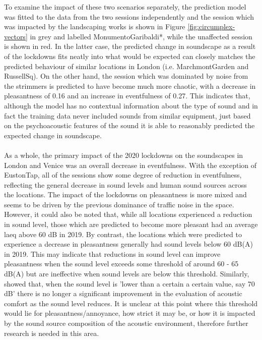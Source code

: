    To examine the impact of these two scenarios separately, the prediction model was fitted to the data from the two sessions independently and the session which was impacted by the landscaping works is shown in Figure \ref{fig:circumplex-vectors} in grey and labelled MonumentoGaribaldi*, while the unaffected session is shown in red. In the latter case, the predicted change in soundscape as a result of the lockdowns fits neatly into what would be expected can closely matches the predicted behaviour of similar locations in London (i.e. MarchmontGarden and RussellSq). On the other hand, the session which was dominated by noise from the strimmers is predicted to have become much more chaotic, with a decrease in pleasantness of 0.16 and an increase in eventfulness of 0.27. This indicates that, although the model has no contextual information about the type of sound and in fact the training data never included sounds from similar equipment, just based on the psychoacoustic features of the sound it is able to reasonably predicted the expected change in soundscape.

   \paragraph*{}As a whole, the primary impact of the 2020 lockdowns on the soundscapes in London and Venice was an overall decrease in eventfulness. With the exception of EustonTap, all of the sessions show some degree of reduction in eventfulness, reflecting the general decrease in sound levels and human sound sources across the locations. The impact of the lockdowns on pleasantness is more mixed and seems to be driven by the previous dominance of traffic noise in the space. However, it could also be noted that, while all locations experienced a reduction in sound level, those which are predicted to become more pleasant had an average \gls{laeq} above 60 dB in 2019. By contrast, the locations which were predicted to experience a decrease in pleasantness generally had sound levels below 60 dB(A) in 2019. This may indicate that reductions in sound level can improve pleasantness when the sound level exceeds some threshold of around 60 - 65 dB(A) but are ineffective when sound levels are below this threshold. Similarly, \citet{Yang2005Acoustic} showed that, when the sound level is 'lower than a certain a certain value, say 70 dB' there is no longer a significant improvement in the evaluation of acoustic comfort as the sound level reduces. It is unclear at this point where this threshold would lie for pleasantness/annoyance, how strict it may be, or how it is impacted by the sound source composition of the acoustic environment, therefore further research is needed in this area.

